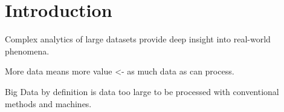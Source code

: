 \section{Introduction}

Complex analytics of large datasets provide deep insight into real-world
phenomena. 

More data means more value <- as much data as can process.

Big Data by definition is data too large to be processed with conventional
methods and machines.

